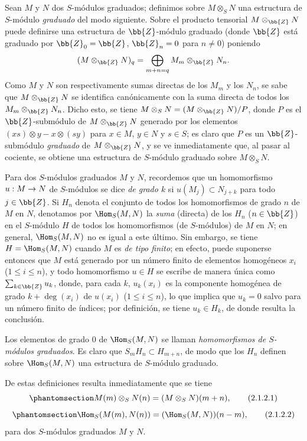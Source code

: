 \documentclass[oneside,10pt]{amsart}
\makeatletter
\renewcommand{\leq}{\leqslant}
\newcommand{\ega@arrow}[2]{\mathchoice{#1}{#2}{#2}{#2}}
\renewcommand{\to}{\ega@arrow{\longrightarrow}{\rightarrow}}
\let\EGAOriginalLabel\label
\renewcommand{\label}[1]{\phantomsection\EGAOriginalLabel{#1}}
\makeatother
\begin{document}
\begin{env}[2.1.2]
\label{II.2.1.2}
Sean $M$ y $N$ dos $S$-módulos graduados; definimos sobre $M\otimes_S N$ una estructura de $S$-módulo \emph{graduado} del modo siguiente.
Sobre el producto tensorial $M\otimes_\bb{Z}N$ puede definirse una estructura de $\bb{Z}$-módulo graduado (donde $\bb{Z}$ está graduado por $\bb{Z}_0=\bb{Z}$, $\bb{Z}_n=0$ para $n\neq0$) poniendo
\[
  (M\otimes_\bb{Z}N)_q
  =\bigoplus_{m+n=q}M_m\otimes_\bb{Z}N_n.
\]
Como $M$ y $N$ son respectivamente sumas directas de los $M_m$ y los $N_n$, se sabe que $M\otimes_\bb{Z}N$ se identifica canónicamente con la suma directa de todos los $M_m\otimes_\bb{Z}N_n$.
Dicho esto, se tiene $M\otimes_S N=(M\otimes_\bb{Z}N)/P$, donde $P$ es el $\bb{Z}$-submódulo de $M\otimes_\bb{Z}N$ generado por los elementos $(xs)\otimes y-x\otimes(sy)$ para $x\in M$, $y\in N$ y $s\in S$; es claro que $P$ es un $\bb{Z}$-submódulo \emph{graduado} de $M\otimes_\bb{Z}N$, y se ve inmediatamente que, al pasar al cociente, se obtiene una estructura de $S$-módulo graduado sobre $M\otimes_S N$.

Para dos $S$-módulos graduados $M$ y $N$, recordemos que un homomorfismo $u:M\to N$ de $S$-módulos se dice \emph{de grado $k$} si $u(M_j)\subset N_{j+k}$ para todo $j\in\bb{Z}$.
Si $H_n$ denota el conjunto de todos los homomorfismos de grado $n$ de $M$ en $N$, denotamos por $\Hom_S(M,N)$ la \emph{suma} (directa) de los $H_n$ ($n\in\bb{Z}$) en el $S$-módulo $H$ de todos los homomorfismos (de $S$-módulos) de $M$ en $N$; en general, $\Hom_S(M,N)$ no es igual a este último.
Sin embargo, se tiene $H=\Hom_S(M,N)$ cuando $M$ es \emph{de tipo finito}; en efecto, puede suponerse entonces que $M$ está generado por un número finito de elementos homogéneos $x_i$ ($1\leq i\leq n$), y todo homomorfismo $u\in H$ se escribe de manera única como $\sum_{k\in\bb{Z}}u_k$, donde, para cada $k$, $u_k(x_i)$ es la componente homogénea de grado $k+\deg(x_i)$ de $u(x_i)$ ($1\leq i\leq n$), lo que implica que $u_k=0$ salvo para un número finito de índices; por definición, se tiene $u_k\in H_k$, de donde resulta la conclusión.

Los elementos de grado $0$ de $\Hom_S(M,N)$ se llaman \emph{homomorfismos de $S$-módulos graduados}.
Es claro que $S_mH_n\subset H_{m+n}$, de modo que los $H_n$ definen sobre $\Hom_S(M,N)$ una estructura de $S$-módulo graduado.

De estas definiciones resulta inmediatamente que se tiene
\[
\label{II.2.1.2.1}
  M(m)\otimes_S N(n)=(M\otimes_S N)(m+n),
  \tag{2.1.2.1}
\]
\[
\label{II.2.1.2.2}
  \Hom_S(M(m),N(n))=(\Hom_S(M,N))(n-m),
  \tag{2.1.2.2}
\]
para dos $S$-módulos graduados $M$ y $N$.


\end{env}
\end{document}
